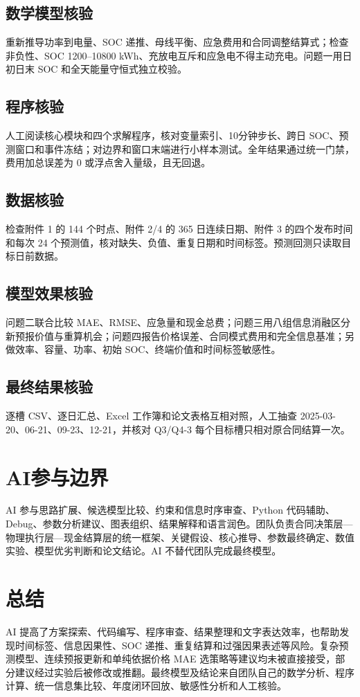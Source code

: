 \documentclass[UTF8,a4paper,11pt]{ctexart}
\begin{document}
\subsection{数学模型核验}重新推导功率到电量、SOC 递推、母线平衡、应急费用和合同调整结算式；检查非负性、SOC 1200--10800 kWh、充放电互斥和应急电不得主动充电。问题一用日初日末 SOC 和全天能量守恒式独立校验。
\subsection{程序核验}人工阅读核心模块和四个求解程序，核对变量索引、10分钟步长、跨日 SOC、预测窗口和事件冻结；对边界和窗口末端进行小样本测试。全年结果通过统一门禁，费用加总误差为 0 或浮点舍入量级，且无回退。
\subsection{数据核验}检查附件 1 的 144 个时点、附件 2/4 的 365 日连续日期、附件 3 的四个发布时间和每次 24 个预测值，核对缺失、负值、重复日期和时间标签。预测回测只读取目标日前数据。
\subsection{模型效果核验}问题二联合比较 MAE、RMSE、应急量和现金总费；问题三用八组信息消融区分新预报价值与重算机会；问题四报告价格误差、合同模式费用和完全信息基准；另做效率、容量、功率、初始 SOC、终端价值和时间标签敏感性。
\subsection{最终结果核验}逐槽 CSV、逐日汇总、Excel 工作簿和论文表格互相对照，人工抽查 2025-03-20、06-21、09-23、12-21，并核对 Q3/Q4-3 每个目标槽只相对原合同结算一次。
\section{AI参与边界}
AI 参与思路扩展、候选模型比较、约束和信息时序审查、Python 代码辅助、Debug、参数分析建议、图表组织、结果解释和语言润色。团队负责合同决策层—物理执行层—现金结算层的统一框架、关键假设、核心推导、参数最终确定、数值实验、模型优劣判断和论文结论。AI 不替代团队完成最终模型。
\section{总结}
AI 提高了方案探索、代码编写、程序审查、结果整理和文字表达效率，也帮助发现时间标签、信息因果性、SOC 递推、重复结算和过强因果表述等风险。复杂预测模型、连续预报更新和单纯依据价格 MAE 选策略等建议均未被直接接受，部分建议经过实验后被修改或推翻。最终模型及结论来自团队自己的数学分析、程序计算、统一信息集比较、年度闭环回放、敏感性分析和人工核验。
\end{document}

